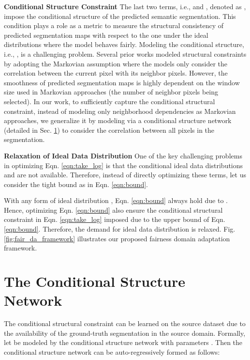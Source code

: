 \documentclass[10pt,twocolumn,letterpaper]{article}
\begin{document}
\noindent
\textbf{Conditional Structure Constraint}
The last two terms, i.e.,  and , denoted as , impose the conditional structure of the predicted semantic segmentation.
This condition plays a role as a metric to measure the structural consistency of predicted segmentation maps with respect to the one under the ideal distributions where the model behaves fairly.
Modeling the conditional structure, i.e., , is a challenging problem. Several prior works 
modeled structural constraints by adopting the Markovian assumption \cite{Zheng_2015_ICCV, chen2018deeplab}
where the models only 
consider the correlation between the current pixel with its neighbor pixels.
However, the smoothness of predicted segmentation maps is highly dependent on the window size used in Markovian approaches (the number of neighbor pixels being selected). 
In our work, to sufficiently capture the conditional structural constraint, instead of modeling only neighborhood dependencies as Markovian approaches, we generalize it by modeling  via a conditional structure network (detailed in Sec. \ref{sec:Cond_Network}) 
to consider the correlation between all pixels in the segmentation. 

\noindent
\textbf{Relaxation of Ideal Data Distribution}
One of the key challenging problems in optimizing Eqn. \eqref{eqn:take_log} is that the conditional ideal data distributions  and  are not available.
Therefore, instead of directly optimizing these terms, let us consider the tight bound as in Eqn. \eqref{eqn:bound}.

With any form of ideal distribution , Eqn. \eqref{eqn:bound} always hold due to . Hence, optimizing Eqn. \eqref{eqn:bound} also ensure the conditional structural constraint in Eqn. \eqref{eqn:take_log} imposed due to the upper bound of Eqn. \eqref{eqn:bound}. Therefore, the demand for ideal data distribution is relaxed.
Fig. \ref{fig:fair_da_framework} illustrates our proposed fairness domain adaptation framework.


\section{The Conditional Structure Network} \label{sec:Cond_Network}

The conditional structural constraint  can be learned on the source dataset due to the availability of the ground-truth segmentation in the source domain.
Formally, let  be modeled by the conditional structure network  with parameters . Then the conditional structure network can be auto-regressively formed as follows:
\vspace{-1mm}
\end{document}
